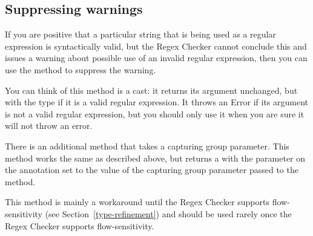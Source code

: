 \subsection{Suppressing warnings}

If you are positive that a particular string that is being used as a
regular expression is syntactically valid, but the Regex Checker cannot
conclude this and issues a warning about possible use of an invalid regular
expression, then you can use the
 method to suppress the
warning.

You can think of this method 
is a cast:  it returns its argument unchanged, but with the type
 if it is a valid regular expression.  It throws an
Error if its argument is not a valid regular expression, but you should
only use it when you are sure it will not throw an error.

There is an additional 
method that takes a capturing group parameter. This method works the same as
described above, but returns a  with the parameter on the
annotation set to the value of the capturing group parameter passed to the method.

This method is
mainly a workaround until the Regex Checker supports flow-sensitivity (see
Section~\ref{type-refinement}) and should be used rarely once the Regex
Checker supports flow-sensitivity.




